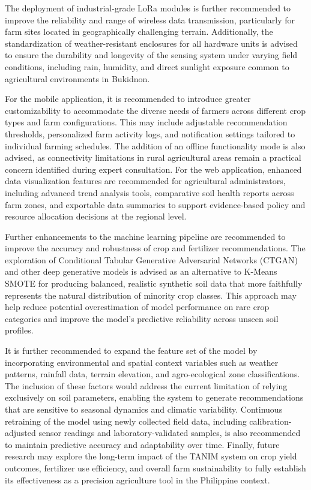 {The deployment of industrial-grade LoRa modules is further recommended to improve the reliability and range of wireless data transmission, particularly for farm sites located in geographically challenging terrain. Additionally, the standardization of weather-resistant enclosures for all hardware units is advised to ensure the durability and longevity of the sensing system under varying field conditions, including rain, humidity, and direct sunlight exposure common to agricultural environments in Bukidnon.


For the mobile application, it is recommended to introduce greater customizability to accommodate the diverse needs of farmers across different crop types and farm configurations. This may include adjustable recommendation thresholds, personalized farm activity logs, and notification 
settings tailored to individual farming schedules. The addition of an offline functionality mode is also advised, as connectivity limitations in rural agricultural areas remain a practical concern identified during expert consultation. For the web application, enhanced data visualization features are recommended for agricultural administrators, including advanced trend analysis tools, comparative soil health reports across farm zones, and exportable data summaries to support evidence-based policy and resource allocation decisions at the regional level.


Further enhancements to the machine learning pipeline are recommended to improve the accuracy and robustness of crop and fertilizer recommendations. The exploration of Conditional Tabular Generative Adversarial Networks (CTGAN) and other deep generative models is advised as an alternative to K-Means SMOTE for producing balanced, realistic synthetic soil data that more faithfully represents the natural distribution of minority crop classes. This approach may help reduce potential overestimation of model performance on rare crop categories and improve the model's predictive reliability across unseen soil profiles.

It is further recommended to expand the feature set of the model by incorporating environmental and spatial context variables such as weather patterns, rainfall data, terrain elevation, and agro-ecological zone classifications. The inclusion of these factors would address the current limitation of relying exclusively on soil parameters, enabling the system to generate recommendations that are sensitive to seasonal dynamics and climatic variability. Continuous retraining of the model using newly collected field data, including calibration-adjusted sensor readings and laboratory-validated samples, is also recommended to maintain predictive accuracy and adaptability over time. Finally, future research may explore 
the long-term impact of the TANIM system on crop yield outcomes, fertilizer use efficiency, and overall farm sustainability to fully establish its effectiveness as a precision agriculture tool in the Philippine context.

\pagebreak
}